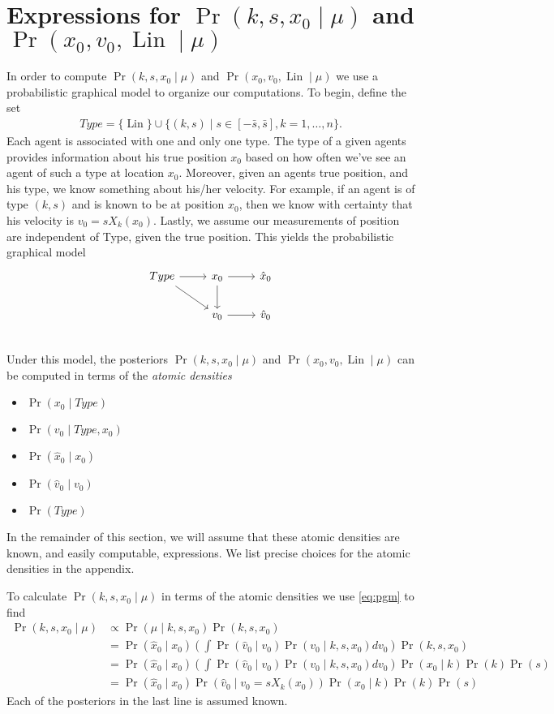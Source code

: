 \documentclass[12pt]{amsart}
\DeclareMathOperator{\Lin}{Lin}
\begin{document}
\section{Expressions for $\Pr( k,s,x_0 \mid \mu)$ and $\Pr( x_0, v_0, \Lin \mid \mu)$}
In order to compute $\Pr( k,s,x_0 \mid \mu)$ and $\Pr( x_0, v_0, \Lin \mid \mu)$ we use a probabilistic graphical model to organize our computations.
To begin, define the set
\begin{align*}
	Type = \{ \Lin \} \cup \{ (k,s) \mid s \in [-\bar{s}, \bar{s}] , k = 1,\dots,n\}.
\end{align*}
Each agent is associated with one and only one type.
The type of a given agents provides information about his true position $x_0$ based on how often we've see an agent of such a type at location $x_0$.
Moreover, given an agents true position, and his type, we know something about his/her velocity.
For example, if an agent is of type $(k,s)$ and is known to be at position $x_0$, then we know with certainty that his velocity is $v_0 = sX_k(x_0)$.
Lastly, we assume our measurements of position are independent of Type, given the true position.
This yields the probabilistic graphical model
\begin{equation}
\begin{tikzcd}
	Type \arrow[r] \arrow[rd] & x_0 \arrow[d] \arrow[r] & \hat{x}_0 \\
	 & v_0 \ar[r] & \hat{v}_0 \\
\end{tikzcd}
\label{eq:pgm}
\end{equation}
Under this model, the posteriors $\Pr( k,s,x_0 \mid \mu)$ and $\Pr( x_0, v_0, \Lin \mid \mu)$ can be computed in terms of the \emph{atomic densities}
\begin{itemize}
	\item $\Pr( x_0 \mid Type )$
	\item $\Pr( v_0 \mid Type,x_0)$
	\item $\Pr( \hat{x}_0 \mid x_0)$
	\item $\Pr( \hat{v}_0 \mid v_0)$
	\item $\Pr(Type)$
\end{itemize}
In the remainder of this section, we will assume that these atomic densities are known, and easily computable, expressions.
We list precise choices for the atomic densities in the appendix.

To calculate $\Pr(k,s,x_0 \mid \mu )$ in terms of the atomic densities we use \eqref{eq:pgm} to find
\begin{align*}
	\Pr( k,s,x_0 \mid \mu ) &\propto \Pr( \mu \mid k,s,x_0) \Pr( k,s,x_0) \\
		&= \Pr( \hat{x}_0 \mid x_0) \left(  \int \Pr( \hat{v}_0 \mid v_0 ) \Pr( v_0 \mid k,s,x_0) dv_0 \right) \Pr(k,s,x_0) \\
		&=  \Pr( \hat{x}_0 \mid x_0) \left(  \int \Pr( \hat{v}_0 \mid v_0 ) \Pr( v_0 \mid k,s,x_0) dv_0 \right) \Pr(x_0 \mid k) \Pr(k) \Pr(s) \\
		&=  \Pr( \hat{x}_0 \mid x_0) \Pr( \hat{v}_0 \mid v_0 = sX_k(x_0) ) \Pr(x_0 \mid k) \Pr(k) \Pr(s)
\end{align*}
Each of the posteriors in the last line is assumed known.
\end{document}
